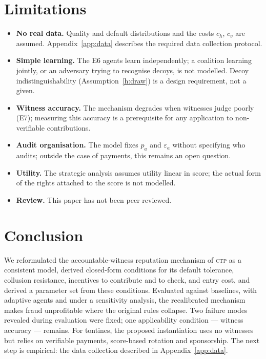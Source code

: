 \documentclass[11pt,a4paper]{article}
\theoremstyle{plain}
\theoremstyle{definition}
\theoremstyle{remark}
\newcommand{\CTP}{\textsc{ctp}}
\newcommand{\1}{\mathbf{1}}
\begin{document}
\section{Limitations}
\label{sec:limits}

\begin{itemize}
  \item \textbf{No real data.} Quality and default distributions and the costs
    $c_h$, $c_v$ are assumed. Appendix~\ref{app:data} describes the required
    data collection protocol.
  \item \textbf{Simple learning.} The E6 agents learn independently; a
    coalition learning jointly, or an adversary trying to recognise decoys, is
    not modelled. Decoy indistinguishability (Assumption~\ref{h:draw}) is a
    design requirement, not a given.
  \item \textbf{Witness accuracy.} The mechanism degrades when witnesses judge
    poorly (E7); measuring this accuracy is a prerequisite for any application
    to non-verifiable contributions.
  \item \textbf{Audit organisation.} The model fixes $p_a$ and
    $\varepsilon_a$ without specifying who audits; outside the case of
    payments, this remains an open question.
  \item \textbf{Utility.} The strategic analysis assumes utility linear in
    score; the actual form of the rights attached to the score is not modelled.
  \item \textbf{Review.} This paper has not been peer reviewed.
\end{itemize}

\section{Conclusion}

We reformulated the accountable-witness reputation mechanism of \CTP{} as a
consistent model, derived closed-form conditions for its default tolerance,
collusion resistance, incentives to contribute and to check, and entry cost,
and derived a parameter set from these conditions. Evaluated against baselines,
with adaptive agents and under a sensitivity analysis, the recalibrated
mechanism makes fraud unprofitable where the original rules collapse. Two
failure modes revealed during evaluation were fixed; one applicability
condition --- witness accuracy --- remains. For tontines, the proposed
instantiation uses no witnesses but relies on verifiable payments, score-based
rotation and sponsorship. The next step is empirical: the data collection
described in Appendix~\ref{app:data}.
\end{document}
